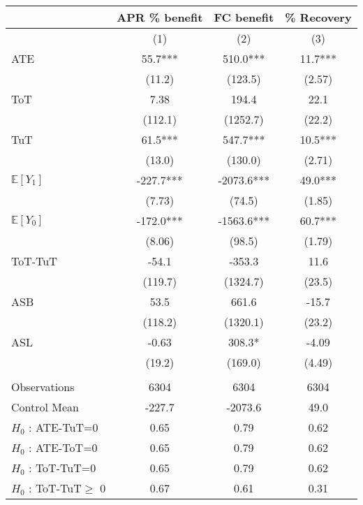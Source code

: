\begin{tabular}{lccc}
\toprule
      & APR \% benefit & FC benefit & \% Recovery \\
\midrule
      & (1)   & (2)   & (3) \\
\midrule
\midrule
ATE   & 55.7*** & 510.0*** & 11.7*** \\
      & (11.2) & (123.5) & (2.57) \\
ToT   & 7.38  & 194.4 & 22.1 \\
      & (112.1) & (1252.7) & (22.2) \\
TuT   & 61.5*** & 547.7*** & 10.5*** \\
      & (13.0) & (130.0) & (2.71) \\
$\mathbb{E}[Y_1]$ & -227.7*** & -2073.6*** & 49.0*** \\
      & (7.73) & (74.5) & (1.85) \\
$\mathbb{E}[Y_0]$ & -172.0*** & -1563.6*** & 60.7*** \\
      & (8.06) & (98.5) & (1.79) \\
\midrule
ToT-TuT & -54.1 & -353.3 & 11.6 \\
      & (119.7) & (1324.7) & (23.5) \\
ASB   & 53.5  & 661.6 & -15.7 \\
      & (118.2) & (1320.1) & (23.2) \\
ASL   & -0.63 & 308.3* & -4.09 \\
      & (19.2) & (169.0) & (4.49) \\
      &       &       &  \\
\midrule
Observations & 6304  & 6304  & 6304 \\
Control Mean & -227.7 & -2073.6 & 49.0 \\
$H_0$ : ATE-TuT=0 & 0.65  & 0.79  & 0.62 \\
$H_0$ : ATE-ToT=0 & 0.65  & 0.79  & 0.62 \\
$H_0$ : ToT-TuT=0 & 0.65  & 0.79  & 0.62 \\
$H_0$ : ToT-TuT$\geq$ 0 & 0.67  & 0.61  & 0.31 \\
\bottomrule
\bottomrule
\end{tabular}%
